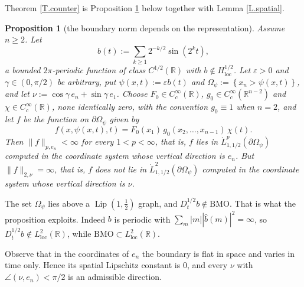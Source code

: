 \documentclass[12pt,leqno]{amsart}
\numberwithin{equation}{section}
\DeclareMathOperator{\Lip}{Lip}
\DeclareMathOperator{\loc}{loc}
\newcommand{\R}{\mathbb R}
\newcommand{\wh}{\widehat}
\newcommand{\abs}[1]{\left\vert#1\right\vert}
\newcommand{\br}[1]{\left(#1\right)}
\newcommand{\set}[1]{\left\{#1\right\}}
\newcommand{\om}{\Omega}
\newcommand{\pd}{\partial}
\newcommand{\dhalf}{D_t^{1/2}}
\newcommand{\BMO}{\mathrm{BMO}}
\theoremstyle{plain}
\newtheorem{proposition}[equation]{Proposition}
\theoremstyle{remark}
\begin{document}
\noindent Theorem \ref{T.counter} is Proposition \ref{P.counter} below
together with Lemma \ref{L.spatial}.

\begin{proposition}[the boundary norm depends on the representation]\label{P.counter}
Assume $n\ge2$. Let
\[
  b(t):=\sum_{k\ge1}2^{-k/2}\sin(2^{k}t) ,
\]
a bounded $2\pi$-periodic function of class $C^{1/2}(\R)$ with
$b\notin H^{1/2}_{\loc}$. Let $\varepsilon>0$ and $\gamma\in(0,\pi/2)$ be arbitrary,
put $\psi(x,t):=\varepsilon b(t)$ and $\om_\psi:=\set{x_n>\psi(x,t)}$, and let
$\nu:=\cos\gamma\,e_n+\sin\gamma\,e_1$. Choose
$F_0\in C_c^\infty(\R)$, $g_0\in C_c^\infty(\R^{n-2})$ and
$\chi\in C_c^\infty(\R)$, none identically zero, with the convention
$g_0\equiv1$ when $n=2$, and let $f$ be the
function on $\pd\om_\psi$ given by
\[
  f\br{x,\psi(x,t),t}=F_0(x_1)\,g_0(x_2,\dots,x_{n-1})\,\chi(t) .
\]
Then $\|f\|_{p,e_n}<\infty$ for every $1<p<\infty$, that is, $f$ lies in
$\dot L^p_{1,1/2}(\pd\om_\psi)$ computed in the coordinate system whose
vertical direction is $e_n$. But $\|f\|_{2,\nu}=\infty$, that is, $f$ does not
lie in $\dot L^2_{1,1/2}(\pd\om_\psi)$ computed in the coordinate system whose
vertical direction is $\nu$.
\end{proposition}

The set $\om_\psi$ lies above a $\Lip(1,\tfrac12)$ graph, and
$\dhalf b\notin\BMO$. That is what the proposition exploits. Indeed $b$ is
periodic with $\sum_m\abs m\abs{\wh b(m)}^2=\infty$, so
$\dhalf b\notin L^2_{\loc}(\R)$, while $\BMO\subset L^2_{\loc}(\R)$.

Observe that in the coordinates of $e_n$ the boundary is flat in space and
varies in time only. Hence its spatial Lipschitz constant is $0$, and every
$\nu$ with $\angle(\nu,e_n)<\pi/2$ is an admissible direction.
\end{document}
